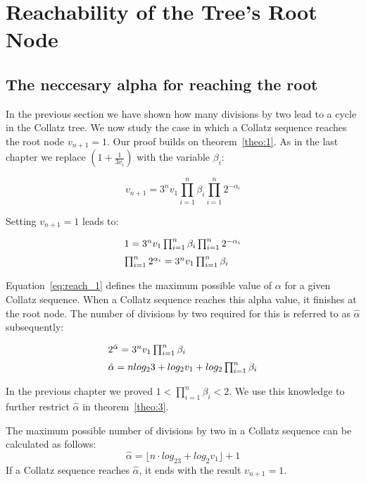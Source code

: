 \chapter{Reachability of the Tree's Root Node}

\section{The neccesary alpha for reaching the root}
In the previous section we have shown how many divisions by two lead to a cycle in the Collatz tree. We now study the case in which a Collatz sequence reaches the root node $v_{n+1}=1$. Our proof builds on theorem~\ref{theo:1}. As in the last chapter we replace $(1+\frac{1}{3v_i})$ with the variable $\beta_i$:

\[
v_{n+1}=3^nv_1\prod_{i=1}^{n}\beta_i\prod_{i=1}^{n}2^{-\alpha_i}
\]

Setting $v_{n+1}=1$ leads to:

\begin{equation}
\label{eq:reach_1}
\begin{array}{l}
1=3^nv_1\prod_{i=1}^{n}\beta_i\prod_{i=1}^{n}2^{-\alpha_i}
\\[\medskipamount]
\prod_{i=1}^{n}2^{\alpha_i}=3^nv_1\prod_{i=1}^{n}\beta_i
\end{array}	
\end{equation}

\par\medskip
Equation~\ref{eq:reach_1} defines the maximum possible value of $\alpha$ for a given Collatz sequence. When a Collatz sequence reaches this alpha value, it finishes at the root node. The number of divisions by two required for this is referred to as $\hat\alpha$ subsequently:

\begin{equation*}
\begin{array}{l}
2^{\hat\alpha}=3^nv_1\prod_{i=1}^{n}\beta_i
\\[\medskipamount]
\hat\alpha=nlog_23+log_2v_1+log_2\prod_{i=1}^{n}\beta_i
\end{array}	
\end{equation*}

\par\medskip
In the previous chapter we proved $1<\prod_{i=1}^{n}\beta_i<2$. We use this knowledge to further restrict $\hat\alpha$ in theorem~\ref{theo:3}.

\bigskip
\begin{theorem}
\label{theo:3}
The maximum possible number of divisions by two in a Collatz sequence can be calculated as follows:
\[
\hat\alpha=\lfloor n\cdot log_23+log_2v_1\rfloor+1
\]
If a Collatz sequence reaches $\hat\alpha$, it ends with the result $v_{n+1}=1$.
\end{theorem}

